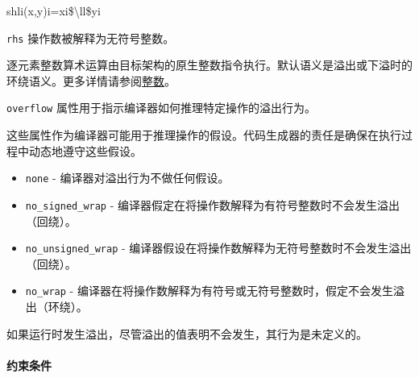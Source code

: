 \documentclass{article}
\begin{document}
shli(x,y)i=xi\$\textbackslash{}ll\$yi


\texttt{rhs} 操作数被解释为无符号整数。



逐元素整数算术运算由目标架构的原生整数指令执行。默认语义是溢出或下溢时的环绕语义。更多详情请参阅\href{https://docs.nvidia.com/cuda/tile-ir/latest/sections/operations.html#op-group-integer}{整数}。



\texttt{overflow} 属性用于指示编译器如何推理特定操作的溢出行为。



这些属性作为编译器可能用于推理操作的假设。代码生成器的责任是确保在执行过程中动态地遵守这些假设。



\begin{itemize}
\item \texttt{none} - 编译器对溢出行为不做任何假设。
\item \texttt{no\_signed\_wrap} - 编译器假定在将操作数解释为有符号整数时不会发生溢出（回绕）。
\item \texttt{no\_unsigned\_wrap} - 编译器假设在将操作数解释为无符号整数时不会发生溢出（回绕）。
\item \texttt{no\_wrap} - 编译器在将操作数解释为有符号或无符号整数时，假定不会发生溢出（环绕）。


\end{itemize}
如果运行时发生溢出，尽管溢出的值表明不会发生，其行为是未定义的。





\paragraph{约束条件}
\end{document}
